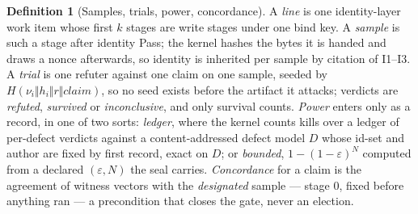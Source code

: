\documentclass[11pt,a4paper]{article}
\theoremstyle{plain}
\theoremstyle{definition}
\newtheorem{definition}{Definition}
\theoremstyle{remark}
\begin{document}
\begin{definition}[Samples, trials, power, concordance]
A \emph{line} is one identity-layer work item whose first $k$ stages are write stages under one bind key. A \emph{sample} is such a stage after identity Pass; the kernel hashes the bytes it is handed and draws a nonce afterwards, so identity is inherited per sample by citation of I1--I3. A \emph{trial} is one refuter against one claim on one sample, seeded by $H(\nu_i \Vert h_i \Vert r \Vert \mathit{claim})$, so no seed exists before the artifact it attacks; verdicts are \emph{refuted}, \emph{survived} or \emph{inconclusive}, and only survival counts. \emph{Power} enters only as a record, in one of two sorts: \emph{ledger}, where the kernel counts kills over a ledger of per-defect verdicts against a content-addressed defect model $D$ whose id-set and author are fixed by first record, exact on $D$; or \emph{bounded}, $1-(1-\varepsilon)^N$ computed from a declared $(\varepsilon,N)$ the seal carries. \emph{Concordance} for a claim is the agreement of witness vectors with the \emph{designated} sample --- stage $0$, fixed before anything ran --- a precondition that closes the gate, never an election.
\end{definition}
\end{document}

